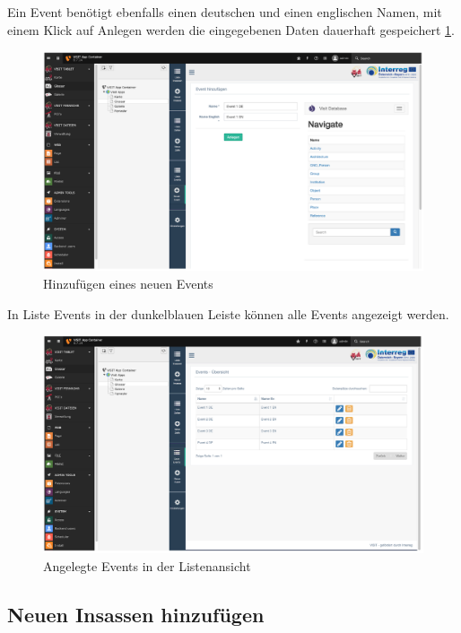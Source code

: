 Ein Event benötigt ebenfalls einen deutschen und einen englischen Namen, mit einem Klick auf Anlegen werden die eingegebenen Daten dauerhaft gespeichert \ref{img:hinzufuegen_event}.
\begin{figure}[ht!]
\centering
\includegraphics[width=12cm]{Figures/paula/glossar/hinzufuegen_event.png}
\caption{Hinzufügen eines neuen Events}
\label{img:hinzufuegen_event}
\end{figure}
In Liste Events in der dunkelblauen Leiste können alle Events angezeigt werden.
\begin{figure}[ht!]
\centering
\includegraphics[width=12cm]{Figures/paula/glossar/angelegte_events_listenansicht.png}
\caption{Angelegte Events in der Listenansicht}
\label{img:angelegte_events_listenansicht}
\end{figure}

\subsection{Neuen Insassen hinzufügen}

